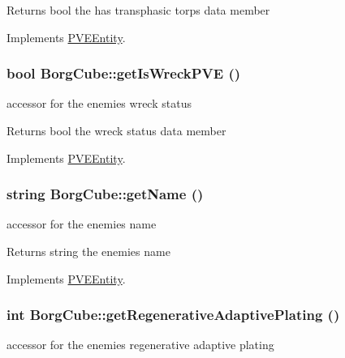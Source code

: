 \begin{DoxyReturn}{Returns}
bool the has transphasic torps data member 
\end{DoxyReturn}


Implements \hyperlink{classPVEEntity}{PVEEntity}.

\hypertarget{classBorgCube_ad1da81322c189f42505e3ee135be7289}{
\subsubsection[{getIsWreckPVE}]{\setlength{\rightskip}{0pt plus 5cm}bool BorgCube::getIsWreckPVE ()}}
\label{d2/d93/classBorgCube_ad1da81322c189f42505e3ee135be7289}
accessor for the enemies wreck status

\begin{DoxyReturn}{Returns}
bool the wreck status data member 
\end{DoxyReturn}


Implements \hyperlink{classPVEEntity}{PVEEntity}.

\hypertarget{classBorgCube_a55fa0b12833f3df64b8157c2c05a2bfe}{
\subsubsection[{getName}]{\setlength{\rightskip}{0pt plus 5cm}string BorgCube::getName ()}}
\label{d2/d93/classBorgCube_a55fa0b12833f3df64b8157c2c05a2bfe}
accessor for the enemies name

\begin{DoxyReturn}{Returns}
string the enemies name 
\end{DoxyReturn}


Implements \hyperlink{classPVEEntity}{PVEEntity}.

\hypertarget{classBorgCube_ab69b67f5b39c837efedad33fb7d21c73}{
\subsubsection[{getRegenerativeAdaptivePlating}]{\setlength{\rightskip}{0pt plus 5cm}int BorgCube::getRegenerativeAdaptivePlating ()}}
\label{d2/d93/classBorgCube_ab69b67f5b39c837efedad33fb7d21c73}
accessor for the enemies regenerative adaptive plating

